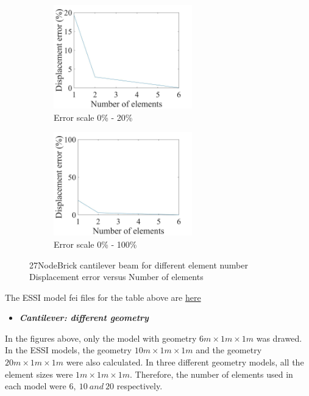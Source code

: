 \documentclass[fleqn,11pt,letter]{article}
\begin{document}
\begin{figure}[H]
  \begin{subfigure}{0.5\textwidth}
    \centering
    \includegraphics[width=6cm]{../Figure_files/27NodeBrick/error27brick_beam_different_element_number.jpeg}
    \caption{Error scale 0\% - 20\%}
  \end{subfigure}
  \begin{subfigure}{0.5\textwidth}
    \centering
    \includegraphics[width=6cm]{../Figure_files/27NodeBrick/error27brick_beam_different_element_number100.jpeg}
    \caption{Error scale 0\% - 100\%}
  \end{subfigure}
  \captionsetup{justification=centering,margin=2cm}
  \caption{27NodeBrick cantilever beam for different element number\\
    Displacement error   versus   Number of elements}
  \label{fig error 27NodeBrick cantilever beam for different element number}
\end{figure}


The ESSI model fei files for the table above are \href{https://github.com/yuan-energy/ESSI_Verification/blob/master/27NodeBrick/cantilever_different_element_number/cantilever_different_element_number.tar.gz?raw=true}{here}



\newpage
\begin{itemize}
  \item \textbf{\emph{Cantilever: different geometry}}
\end{itemize}

In the figures above, only the model with geometry $6m\times 1m \times 1m$ was drawed. In the ESSI models, the geometry $10m\times 1m \times 1m$ and the geometry $20m\times 1m \times 1m$ were also calculated. In three different geometry models, all the element sizes were $1m\times 1m \times 1m$. Therefore, the number of elements used in each model were $6,\ 10\ and\ 20$ respectively.
\end{document}
